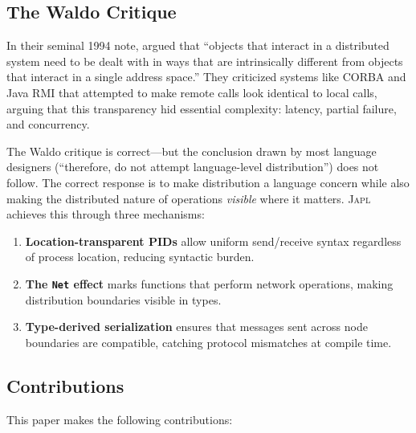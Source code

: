 \documentclass[11pt,a4paper]{article}
\newcommand{\japl}{\textsc{Japl}}
\begin{document}
\subsection{The Waldo Critique}

In their seminal 1994 note, \citet{waldo1996note} argued that ``objects that
interact in a distributed system need to be dealt with in ways that are
intrinsically different from objects that interact in a single address space.''
They criticized systems like CORBA and Java RMI that attempted to make remote
calls look identical to local calls, arguing that this transparency hid
essential complexity: latency, partial failure, and concurrency.

The Waldo critique is correct---but the conclusion drawn by most language
designers (``therefore, do not attempt language-level distribution'') does
not follow. The correct response is to make distribution a language concern
while also making the distributed nature of operations \emph{visible} where
it matters. \japl{} achieves this through three mechanisms:

\begin{enumerate}[nosep]
  \item \textbf{Location-transparent PIDs} allow uniform send/receive syntax
        regardless of process location, reducing syntactic burden.
  \item \textbf{The \texttt{Net} effect} marks functions that perform
        network operations, making distribution boundaries visible in types.
  \item \textbf{Type-derived serialization} ensures that messages sent across
        node boundaries are compatible, catching protocol mismatches at
        compile time.
\end{enumerate}

\subsection{Contributions}

This paper makes the following contributions:
\end{document}
